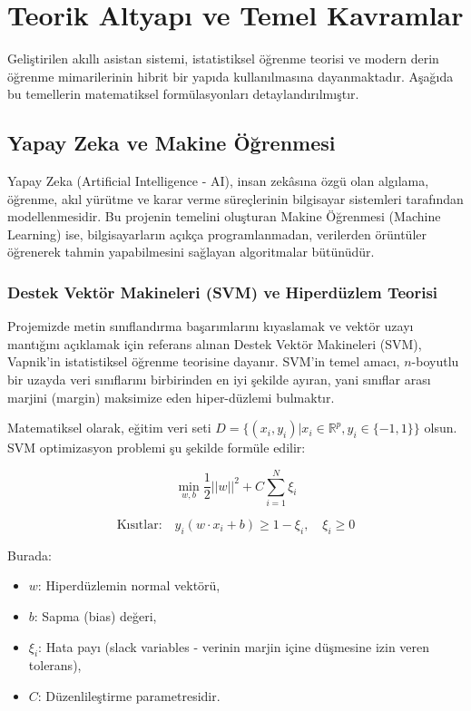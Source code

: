 \documentclass[12pt,a4paper]{report}
\begin{document}
\section{Teorik Altyapı ve Temel Kavramlar}

Geliştirilen akıllı asistan sistemi, istatistiksel öğrenme teorisi ve modern derin öğrenme mimarilerinin hibrit bir yapıda kullanılmasına dayanmaktadır. Aşağıda bu temellerin matematiksel formülasyonları detaylandırılmıştır.

\subsection{Yapay Zeka ve Makine Öğrenmesi}
Yapay Zeka (Artificial Intelligence - AI), insan zekâsına özgü olan algılama, öğrenme, akıl yürütme ve karar verme süreçlerinin bilgisayar sistemleri tarafından modellenmesidir. Bu projenin temelini oluşturan Makine Öğrenmesi (Machine Learning) ise, bilgisayarların açıkça programlanmadan, verilerden örüntüler öğrenerek tahmin yapabilmesini sağlayan algoritmalar bütünüdür.

\subsubsection{Destek Vektör Makineleri (SVM) ve Hiperdüzlem Teorisi}
Projemizde metin sınıflandırma başarımlarını kıyaslamak ve vektör uzayı mantığını açıklamak için referans alınan Destek Vektör Makineleri (SVM), Vapnik'in istatistiksel öğrenme teorisine dayanır. SVM'in temel amacı, $n$-boyutlu bir uzayda veri sınıflarını birbirinden en iyi şekilde ayıran, yani sınıflar arası marjini (margin) maksimize eden hiper-düzlemi bulmaktır.

Matematiksel olarak, eğitim veri seti $D = \{(x_i, y_i) | x_i \in \mathbb{R}^p, y_i \in \{-1, 1\}\}$ olsun. SVM optimizasyon problemi şu şekilde formüle edilir:

\begin{equation}
    \min_{w,b} \frac{1}{2} ||w||^2 + C \sum_{i=1}^{N} \xi_i
\end{equation}

\begin{equation}
    \text{Kısıtlar:} \quad y_i (w \cdot x_i + b) \geq 1 - \xi_i, \quad \xi_i \geq 0
\end{equation}

Burada:
\begin{itemize}
    \item $w$: Hiperdüzlemin normal vektörü,
    \item $b$: Sapma (bias) değeri,
    \item $\xi_i$: Hata payı (slack variables - verinin marjin içine düşmesine izin veren tolerans),
    \item $C$: Düzenlileştirme parametresidir.
\end{itemize}
\end{document}
